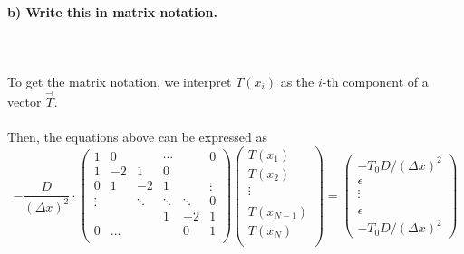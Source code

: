 \paragraph{
    b) Write this in matrix notation.
} \ \\
    \\
    To get the matrix notation, we interpret $T(x_i)$ as the
    $i$-th component of a vector $\vec{T}$. \\
    \\
    Then, the equations above can be expressed as
    \begin{equation}
        -\frac{D}{(\Delta x)^2} \cdot
        \begin{pmatrix}
            1     & 0     &        &\cdots &       & 0 \\
            1     &-2     & 1      & 0     &       &   \\
            0     & 1     & -2     & 1     &       &\vdots \\
            \vdots&       &\ddots  &\ddots & \ddots&  0\\
            &       &        &    1  &  -2   & 1 \\
            0     & \dots &        &      &   0   &1    \\
        \end{pmatrix}
        \begin{pmatrix}
            T(x_1) \\
            T(x_2)\\
            \vdots \\
            \\
            T(x_{N-1})\\
            T(x_N) \\
        \end{pmatrix}=\begin{pmatrix}
            -T_0D/(\Delta x)^2 \\
            \epsilon \\
            \vdots \\
            \\
            \epsilon \\
            -T_0D/(\Delta x)^2
        \end{pmatrix}
    \end{equation}
